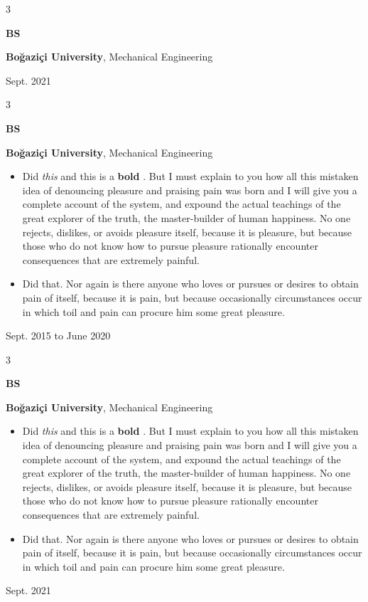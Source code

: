 \documentclass[10pt, letterpaper]{article}
\newenvironment{highlights}{
    \begin{itemize}[
        topsep=0.10 cm,
        parsep=0.10 cm,
        partopsep=0pt,
        itemsep=0pt,
        leftmargin=0.4 cm + 10pt
    ]
}{
    \end{itemize}
} %
\newenvironment{threecolentry}[3][]{
    \onecolentry
    \def\thirdColumn{#3}
    \setcolumnwidth{1 cm, \fill, 4.5 cm}
    \begin{paracol}{3}
    {\raggedright #2} \switchcolumn
}{
    \switchcolumn \raggedleft \thirdColumn
    \end{paracol}
    \endonecolentry
} %
\let\hrefWithoutArrow\href
\renewcommand{\href}[2]{\hrefWithoutArrow{#1}{\mbox{\ifthenelse{\equal{#2}{}}{ }{#2 }\raisebox{.15ex}{\footnotesize \faExternalLink*}}}}
\begin{document}
        \vspace{0.2 cm}

        \begin{threecolentry}{\textbf{BS}}{
            Sept. 2021
        }
            \textbf{Boğaziçi University}, Mechanical Engineering
        \end{threecolentry}

        \vspace{0.2 cm}

        \begin{threecolentry}{\textbf{BS}}{
            Sept. 2015 to June 2020
        }
            \textbf{Boğaziçi University}, Mechanical Engineering
            \begin{highlights}
                \item Did \textit{this} and this is a \textbf{bold} \href{https://example.com}{link}. But I must explain to you how all this mistaken idea of denouncing pleasure and praising pain was born and I will give you a complete account of the system, and expound the actual teachings of the great explorer of the truth, the master-builder of human happiness. No one rejects, dislikes, or avoids pleasure itself, because it is pleasure, but because those who do not know how to pursue pleasure rationally encounter consequences that are extremely painful.
                \item Did that. Nor again is there anyone who loves or pursues or desires to obtain pain of itself, because it is pain, but because occasionally circumstances occur in which toil and pain can procure him some great pleasure.
            \end{highlights}
        \end{threecolentry}

        \vspace{0.2 cm}

        \begin{threecolentry}{\textbf{BS}}{
            Sept. 2021
        }
            \textbf{Boğaziçi University}, Mechanical Engineering
            \begin{highlights}
                \item Did \textit{this} and this is a \textbf{bold} \href{https://example.com}{link}. But I must explain to you how all this mistaken idea of denouncing pleasure and praising pain was born and I will give you a complete account of the system, and expound the actual teachings of the great explorer of the truth, the master-builder of human happiness. No one rejects, dislikes, or avoids pleasure itself, because it is pleasure, but because those who do not know how to pursue pleasure rationally encounter consequences that are extremely painful.
                \item Did that. Nor again is there anyone who loves or pursues or desires to obtain pain of itself, because it is pain, but because occasionally circumstances occur in which toil and pain can procure him some great pleasure.
            \end{highlights}
        \end{threecolentry}
\end{document}
